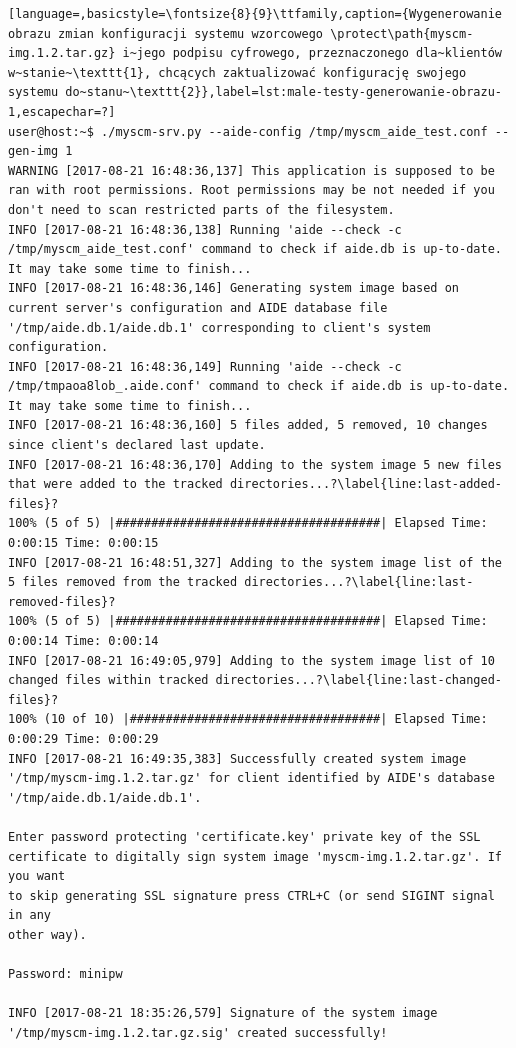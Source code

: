 \documentclass[thesis]{subfiles}
\begin{document}
\begin{lstlisting}[language=,basicstyle=\fontsize{8}{9}\ttfamily,caption={Wygenerowanie obrazu zmian konfiguracji systemu wzorcowego \protect\path{myscm-img.1.2.tar.gz} i~jego podpisu cyfrowego, przeznaczonego dla~klientów w~stanie~\texttt{1}, chcących zaktualizować konfigurację swojego systemu do~stanu~\texttt{2}},label=lst:male-testy-generowanie-obrazu-1,escapechar=?]
user@host:~$ ./myscm-srv.py --aide-config /tmp/myscm_aide_test.conf --gen-img 1
WARNING [2017-08-21 16:48:36,137] This application is supposed to be ran with root permissions. Root permissions may be not needed if you don't need to scan restricted parts of the filesystem.
INFO [2017-08-21 16:48:36,138] Running 'aide --check -c /tmp/myscm_aide_test.conf' command to check if aide.db is up-to-date. It may take some time to finish...
INFO [2017-08-21 16:48:36,146] Generating system image based on current server's configuration and AIDE database file '/tmp/aide.db.1/aide.db.1' corresponding to client's system configuration.
INFO [2017-08-21 16:48:36,149] Running 'aide --check -c /tmp/tmpaoa8lob_.aide.conf' command to check if aide.db is up-to-date. It may take some time to finish...
INFO [2017-08-21 16:48:36,160] 5 files added, 5 removed, 10 changes since client's declared last update.
INFO [2017-08-21 16:48:36,170] Adding to the system image 5 new files that were added to the tracked directories...?\label{line:last-added-files}?
100% (5 of 5) |#####################################| Elapsed Time: 0:00:15 Time: 0:00:15
INFO [2017-08-21 16:48:51,327] Adding to the system image list of the 5 files removed from the tracked directories...?\label{line:last-removed-files}?
100% (5 of 5) |#####################################| Elapsed Time: 0:00:14 Time: 0:00:14
INFO [2017-08-21 16:49:05,979] Adding to the system image list of 10 changed files within tracked directories...?\label{line:last-changed-files}?
100% (10 of 10) |###################################| Elapsed Time: 0:00:29 Time: 0:00:29
INFO [2017-08-21 16:49:35,383] Successfully created system image '/tmp/myscm-img.1.2.tar.gz' for client identified by AIDE's database '/tmp/aide.db.1/aide.db.1'.

Enter password protecting 'certificate.key' private key of the SSL
certificate to digitally sign system image 'myscm-img.1.2.tar.gz'. If you want
to skip generating SSL signature press CTRL+C (or send SIGINT signal in any
other way).

Password: minipw

INFO [2017-08-21 18:35:26,579] Signature of the system image '/tmp/myscm-img.1.2.tar.gz.sig' created successfully!
\end{lstlisting}
\end{document}
